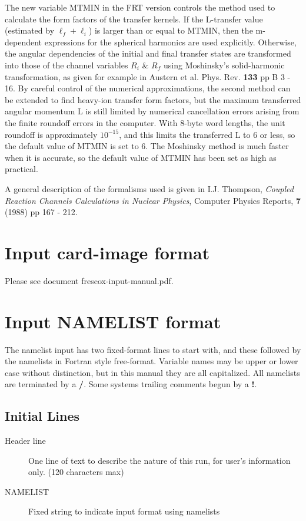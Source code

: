 \documentclass[11pt]{article}
\begin{document}
The new variable MTMIN in the FRT version controls the method used to
calculate the form factors of the transfer kernels. If the L-transfer value
(estimated by $\ell_f + \ell_i$)
is larger than or equal to MTMIN, then the m-dependent expressions for the
spherical harmonics are used explicitly.
Otherwise, the
angular dependencies of the initial and final transfer states
are transformed into those of the channel variables $R_{i}$ \& $R_{f}$ using
Moshinsky's solid-harmonic transformation, as given for example
in
Austern et al. Phys. Rev. {\bf 133} pp B 3 - 16.
%
By careful control of the numerical approximations, the second method can
be extended to find heavy-ion transfer form factors, but the maximum
transferred angular momentum L is still limited by numerical cancellation
errors arising from the finite roundoff errors in the computer.
With 8-byte word lengths, the unit roundoff is approximately $10^{-15}$,
and this limits the transferred L to 6 or less, so the default value
of MTMIN is set to 6. The Moshinsky method is much faster when it is
accurate, so the default value of MTMIN has been set as high as practical.

A general description of the formalisms used is given in
I.J. Thompson,
{\em Coupled Reaction Channels Calculations in Nuclear Physics},
Computer Physics Reports, {\bf 7} (1988) pp 167 - 212.

\newpage
\section{Input card-image format}
Please see document   frescox-input-manual.pdf.
\section{Input NAMELIST format}
The namelist input has two fixed-format lines to start with, and these followed by the namelists in Fortran style free-format. 
Variable names may be upper or lower case without distinction, but in this manual they are all capitalized.
All namelists are terminated by a {\bf /}. Some systems trailing comments begun by a {\bf !}.

\subsection{Initial Lines}
\begin{description}
\item[Header line] \hfill 

One line of text to describe the nature of this run, for user's information only. (120 characters max)
\item[NAMELIST] \hfill 

Fixed string to indicate input format using namelists
\end{description}
\end{document}
